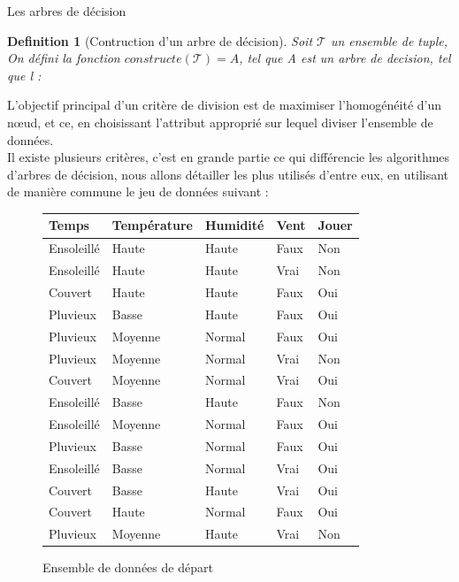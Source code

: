 \documentclass[a4paper, 11pt]{report}
\newtheorem{definition}{Definition}
\newcommand{\tupleset}{\ensuremath{\mathcal{T}}}
\begin{document}
\begin{chapter}{Les arbres de décision}
\begin{definition}[Contruction d'un arbre de décision]
Soit $\tupleset$ un ensemble de tuple, \\
On défini la fonction $constructe(\tupleset) = A$, tel que A est un arbre de decision, tel que l :
\end{definition}



L'objectif principal d'un critère de division est de maximiser l'homogénéité d'un nœud, et ce, en choisissant l'attribut approprié sur lequel diviser l'ensemble de données.\\
Il existe plusieurs critères, c'est en grande partie ce qui différencie les algorithmes d'arbres de décision, nous allons détailler les plus utilisés d'entre eux, en utilisant de manière commune le jeu de données suivant :
\begin{figure}[!h]
\begin{center}

\begin{tabular}{| l | l | l | l | l |}
\hline
\rowcolor{gray!25}
Temps & Température & Humidité & Vent & Jouer \\
\hline
Ensoleillé & Haute & Haute & Faux & Non \\
\hline
Ensoleillé & Haute & Haute & Vrai & Non \\
\hline
Couvert & Haute & Haute & Faux & Oui \\
\hline
Pluvieux & Basse & Haute & Faux & Oui \\
\hline
Pluvieux & Moyenne & Normal & Faux & Oui \\
\hline
Pluvieux & Moyenne & Normal & Vrai & Non \\
\hline
Couvert & Moyenne & Normal & Vrai & Oui \\
\hline
Ensoleillé & Basse & Haute & Faux & Non \\
\hline
Ensoleillé & Moyenne & Normal & Faux & Oui \\
\hline
Pluvieux & Basse & Normal & Faux & Oui \\
\hline
Ensoleillé & Basse & Normal & Vrai & Oui \\
\hline
Couvert & Basse & Haute & Vrai & Oui \\
\hline
Couvert & Haute & Normal & Faux & Oui \\
\hline
Pluvieux & Moyenne & Haute & Vrai & Non \\
\hline
\end{tabular}
\caption{Ensemble de données de départ}
\end{center}
\end{figure}

\end{chapter}
\end{document}
